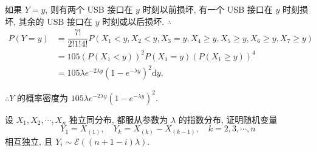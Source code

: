 \documentclass[color=black,device=normal,lang=cn]{elegantnote}
\numberwithin{equation}{section}
\theoremstyle{plain}
\numberwithin{exercise}{exsection}
\begin{document}
\begin{solution}
    如果 $Y=y$, 则有两个 USB 接口在 $y$ 时刻以前损坏, 有一个 USB 接口在 $y$ 时刻损坏, 其余的 USB 接口在 $y$ 时刻或以后损坏. $\therefore$
    \begin{align*}
        P(Y=y) & =\dfrac{7!}{2!1!4!}P(X_1<y,X_2<y,X_3=y,X_4\geq y,X_5\geq y,X_6\geq y,X_7\geq y) \\
        & =105(P(X_1<y))^2P(X_1=y)(P(X_1\geq y))^4 \\
        & =105\lambda e^{-2\lambda y}(1-e^{-\lambda y})^2\mathrm{d}y,
    \end{align*}

    $\therefore Y$ 的概率密度为 $105\lambda e^{-2\lambda y}(1-e^{-\lambda y})^2$.
\end{solution}
\addtocounter{exercise}{2}
\begin{exercise}%
    设 $X_1,X_2,\cdots,X_n$ 独立同分布, 都服从参数为 $\lambda$ 的指数分布, 证明随机变量
    \[Y_1=X_{(1)},\quad Y_k=X_{(k)}-X_{(k-1)},\quad k=2,3,\cdots,n\]
    相互独立, 且 $Y_i\sim\mathcal{E}((n+1-i)\lambda)$.
\end{exercise}
\end{document}
